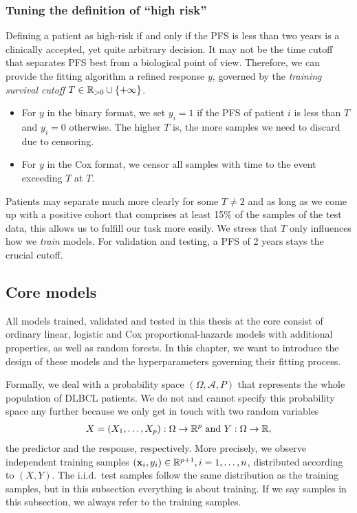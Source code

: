 \subsubsection{Tuning the definition of ``high risk''}

Defining a patient as high-risk if and only if the PFS is less than two years
is a clinically accepted, yet quite arbitrary decision. It may not be the time cutoff that 
separates PFS best from a biological point of view. Therefore, we can provide the fitting 
algorithm a refined response $y$, governed by the \textit{training survival cutoff} $T \in 
\mathbb{R}_{> 0} \cup \{ +\infty \}$.
\begin{itemize}
    \item For $y$ in the binary format, we set $y_i = 1$ if the PFS 
        of patient $i$ is less than $T$ and $y_i = 0$ otherwise. The higher $T$ is, the more 
        samples we need to discard due to censoring.
    \item For $y$ in the Cox format, we censor all samples with time to the event exceeding $T$ at 
        $T$.
\end{itemize}
Patients may separate much more clearly for some $T \neq 2$ and as long as we come up 
with a positive cohort that comprises at least 15\% of the samples of the test data, this allows us 
to fulfill our task more easily. We stress that $T$ only influences how we \textit{train} models. 
For validation and testing, a PFS of \num{2} years stays the crucial cutoff.

\subsection{Core models}\label{subsec:core-models}

All models trained, validated and tested in this thesis at the core consist of ordinary linear, 
logistic and Cox proportional-hazards models with additional properties, as well as random forests.
In this chapter, we want to introduce the design of these models and the hyperparameters governing 
their fitting process.

Formally, we deal with a probability space $(\Omega, \mathcal{A}, P)$ that represents the whole 
population of DLBCL patients. We do not and cannot specify this probability space any further because 
we only get in touch with two random variables 
\begin{align}
    X = (X_1, \ldots, X_p): \Omega \to \mathbb{R}^p \text{ and } Y: \Omega \to \mathbb{R},
\end{align}
the predictor and the response, respectively. More 
precisely, we observe independent training samples $(\mathbf{x}_i, y_i) \in \mathbb{R}^{p+1}, i = 1, \ldots, n$, 
distributed according to $(X, Y)$. The i.i.d.\ test samples follow the same 
distribution as the training samples, but in this subsection everything is about training. If we 
say samples in this subsection, we always refer to the training samples.

